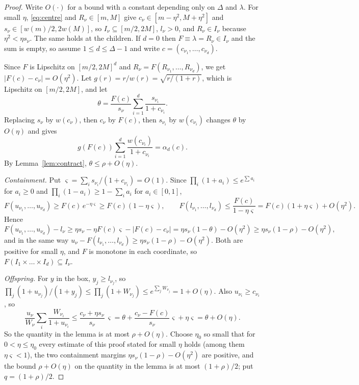 \documentclass[11pt]{amsart}
\begin{document}
\begin{proof}
Write $O(\cdot)$ for a bound with a constant depending only on $\Delta$ and $\lambda$. For small $\eta$, \eqref{eq:centre} and $R_\nu\in[m,M]$ give $c_\nu\in[m-\eta^2,M+\eta^2]$ and $s_\nu\in[w(m)/2,2w(M)]$, so $I_\nu\subseteq[m/2,2M]$, $l_\nu>0$, and $R_\nu\in I_\nu$ because $\eta^2<\eta s_\nu$. The same holds at the children. If $d=0$ then $F\equiv\lambda=R_\nu\in I_\nu$ and the sum is empty, so assume $1\le d\le\Delta-1$ and write $c=(c_{\nu_1},\dots,c_{\nu_d})$.

Since $F$ is Lipschitz on $[m/2,2M]^d$ and $R_\nu=F(R_{\nu_1},\dots,R_{\nu_d})$, we get $|F(c)-c_\nu|=O(\eta^2)$. Let $g(r)=r/w(r)=\sqrt{r/(1+r)}$, which is Lipschitz on $[m/2,2M]$, and let
\[
\theta=\frac{F(c)}{s_\nu}\sum_{i=1}^d\frac{s_{\nu_i}}{1+c_{\nu_i}} .
\]
Replacing $s_\nu$ by $w(c_\nu)$, then $c_\nu$ by $F(c)$, then $s_{\nu_i}$ by $w(c_{\nu_i})$ changes $\theta$ by $O(\eta)$ and gives
\[
g(F(c))\sum_{i=1}^d\frac{w(c_{\nu_i})}{1+c_{\nu_i}}=\alpha_d(c).
\]
By Lemma~\ref{lem:contract}, $\theta\le\rho+O(\eta)$.

\emph{Containment.} Put $\varsigma=\sum_is_{\nu_i}/(1+c_{\nu_i})=O(1)$. Since $\prod_i(1+a_i)\le e^{\sum a_i}$ for $a_i\ge0$ and $\prod_i(1-a_i)\ge1-\sum_ia_i$ for $a_i\in[0,1]$,
\[
F(u_{\nu_1},\dots,u_{\nu_d})\ge F(c)\,e^{-\eta\varsigma}\ge F(c)(1-\eta\varsigma),\qquad
F(l_{\nu_1},\dots,l_{\nu_d})\le\frac{F(c)}{1-\eta\varsigma}=F(c)(1+\eta\varsigma)+O(\eta^2).
\]
Hence
\[
F(u_{\nu_1},\dots,u_{\nu_d})-l_\nu\ge\eta s_\nu-\eta F(c)\varsigma-|F(c)-c_\nu|=\eta s_\nu(1-\theta)-O(\eta^2)\ge\eta s_\nu(1-\rho)-O(\eta^2),
\]
and in the same way $u_\nu-F(l_{\nu_1},\dots,l_{\nu_d})\ge\eta s_\nu(1-\rho)-O(\eta^2)$. Both are positive for small $\eta$, and $F$ is monotone in each coordinate, so $F(I_1\times\dots\times I_d)\subseteq I_\nu$.

\emph{Offspring.} For $y$ in the box, $y_j\ge l_{\nu_j}$, so $\prod_j(1+u_{\nu_j})/(1+y_j)\le\prod_j(1+W_{\nu_j})\le e^{\sum_jW_{\nu_j}}=1+O(\eta)$. Also $u_{\nu_i}\ge c_{\nu_i}$, so
\[
\frac{u_\nu}{W_\nu}\sum_i\frac{W_{\nu_i}}{1+u_{\nu_i}}\le\frac{c_\nu+\eta s_\nu}{s_\nu}\,\varsigma=\theta+\frac{c_\nu-F(c)}{s_\nu}\varsigma+\eta\varsigma=\theta+O(\eta).
\]
So the quantity in the lemma is at most $\rho+O(\eta)$. Choose $\eta_0$ so small that for $0<\eta\le\eta_0$ every estimate of this proof stated for small $\eta$ holds (among them $\eta\varsigma<1$), the two containment margins $\eta s_\nu(1-\rho)-O(\eta^2)$ are positive, and the bound $\rho+O(\eta)$ on the quantity in the lemma is at most $(1+\rho)/2$; put $q=(1+\rho)/2$.
\end{proof}
\end{document}
